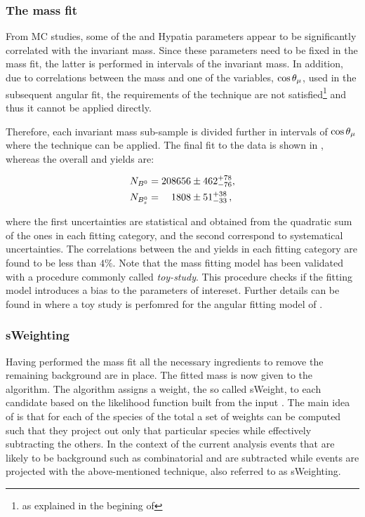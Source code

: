 \subsubsection{The mass fit}
From MC studies, some of the \Bs and \Bd Hypatia parameters appear to be significantly correlated with the \mkpi invariant mass.
Since these parameters need to be fixed in the mass fit, the latter is performed in intervals of the
\mkpi invariant mass. In addition, due to correlations between the mass and one of the variables, $\cos\theta_{\mu}$, used in
the subsequent angular fit, the requirements of the \sPlot technique are not satisfied\footnote{as explained in the begining
of } and thus it cannot be applied directly.

Therefore, each \mkpi invariant mass sub-sample is divided further in intervals of $\cos\theta_{\mu}$ where the \sPlot technique
can be applied. The final fit to the data is shown in , whereas the overall \Bs and \Bd yields are:

\begin{align}
  \centering
  N_{\Bd} &= 208656  \pm  462 ^{+ 78	}_{- 76}, \\
  N_{\Bs} &= \phantom{00}1808  \pm   51 ^{+ 38	}_{- 33} \, ,
  \label{signal_yields}
\end{align}

\noindent where the first uncertainties are statistical and obtained from the quadratic sum of the ones in each fitting category,
and the second correspond to systematical uncertainties. The correlations between the \Bd and \Bs yields in each fitting category
are found to be less than $4\%$. Note that the mass fitting model has been validated with a procedure commonly called {\it toy-study}.
This procedure checks if the fitting model introduces a bias to the parameters of intereset. Further details can be found in
 where a toy study is perfomred for the angular fitting model of .

\subsubsection{sWeighting}
Having performed the mass fit all the necessary ingredients to remove the remaining background are in place.
The fitted mass \pdf is now given to the \sPlot algorithm. The algorithm assigns a weight, the so called sWeight, to each candidate
based on the likelihood function built from the input \pdf. The main idea of \sPlot is that for each of the species of the total
\pdf a set of weights can be computed such that they project out only that particular species while effectively subtracting the others.
In the context of the current analysis events that are likely to be background such as combinatorial and \LbJpsipK are
subtracted while \BJpsiKst events are projected with the above-mentioned technique, also referred to as sWeighting.

